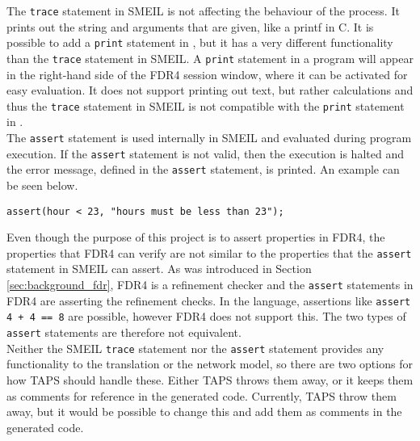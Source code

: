 The \texttt{trace} statement in SMEIL is not affecting the behaviour of the process. It prints out the string and arguments that are given, like a printf in C. It is possible to add a \texttt{print} statement in \cspm{}, but it has a very different functionality than the \texttt{trace} statement in SMEIL. A \texttt{print} statement in a \cspm{} program will appear in the right-hand side of the FDR4 session window, where it can be activated for easy evaluation. It does not support printing out text, but rather calculations and thus the \texttt{trace} statement in SMEIL is not compatible with the \texttt{print} statement in \cspm{}.\\

The \texttt{assert} statement is used internally in SMEIL and evaluated during program execution. If the \texttt{assert} statement is not valid, then the execution is halted and the error message, defined in the \texttt{assert} statement, is printed. An example can be seen below.
\begin{verbatim}
assert(hour < 23, "hours must be less than 23");
\end{verbatim}
Even though the purpose of this project is to assert properties in FDR4, the properties that FDR4 can verify are not similar to the properties that the \texttt{assert} statement in SMEIL can assert. As was introduced in Section \ref{sec:background_fdr}, FDR4 is a refinement checker and the \texttt{assert} statements in FDR4 are asserting the refinement checks. In the \cspm{} language, assertions like \texttt{assert 4 + 4 == 8} are possible, however FDR4 does not support this. The two types of \texttt{assert} statements are therefore not equivalent.\\

Neither the SMEIL \texttt{trace} statement nor the \texttt{assert} statement provides any functionality to the translation or the network model, so there are two options for how TAPS should handle these. Either TAPS throws them away, or it keeps them as comments for reference in the generated code. Currently, TAPS throw them away, but it would be possible to change this and add them as comments in the generated \cspm{} code.\\

